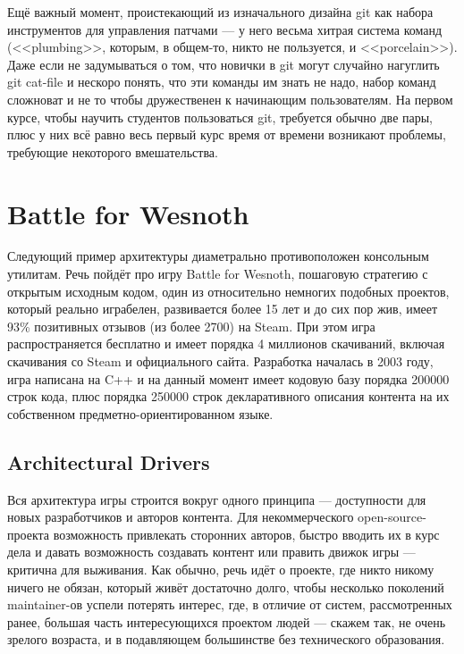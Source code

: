 \documentclass{../text-style}
\begin{document}
Ещё важный момент, проистекающий из изначального дизайна git как набора инструментов для управления патчами --- у него весьма хитрая система команд (<<plumbing>>, которым, в общем-то, никто не пользуется, и <<porcelain>>). Даже если не задумываться о том, что новички в git могут случайно нагуглить git cat-file и нескоро понять, что эти команды им знать не надо, набор команд сложноват и не то чтобы дружественен к начинающим пользователям. На первом курсе, чтобы научить студентов пользоваться git, требуется обычно две пары, плюс у них всё равно весь первый курс время от времени возникают проблемы, требующие некоторого вмешательства.

\section{Battle for Wesnoth}

Следующий пример архитектуры диаметрально противоположен консольным утилитам. Речь пойдёт про игру Battle for Wesnoth, пошаговую стратегию с открытым исходным кодом, один из относительно немногих подобных проектов, который реально играбелен, развивается более 15 лет и до сих пор жив, имеет 93\% позитивных отзывов (из более 2700) на Steam. При этом игра распространяется бесплатно и имеет порядка 4 миллионов скачиваний, включая скачивания со Steam и официального сайта. Разработка началась в 2003 году, игра написана на C++ и на данный момент имеет кодовую базу порядка 200000 строк кода, плюс порядка 250000 строк декларативного описания контента на их собственном предметно-ориентированном языке.

\subsection{Architectural Drivers}

Вся архитектура игры строится вокруг одного принципа --- доступности для новых разработчиков и авторов контента. Для некоммерческого open-source-проекта возможность привлекать сторонних авторов, быстро вводить их в курс дела и давать возможность создавать контент или править движок игры --- критична для выживания. Как обычно, речь идёт о проекте, где никто никому ничего не обязан, который живёт достаточно долго, чтобы несколько поколений maintainer-ов успели потерять интерес, где, в отличие от систем, рассмотренных ранее, большая часть интересующихся проектом людей --- скажем так, не очень зрелого возраста, и в подавляющем большинстве без технического образования.
\end{document}
